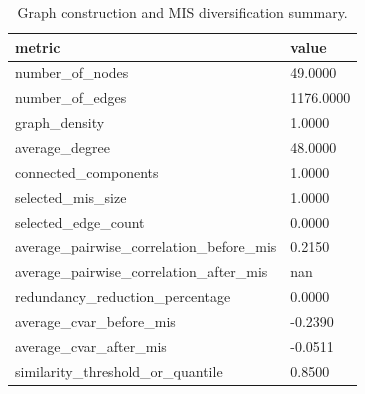 \begin{table}[htbp]
\centering
\begin{tabular}{ll}
\hline
metric & value \\
\hline
number_of_nodes & 49.0000 \\
number_of_edges & 1176.0000 \\
graph_density & 1.0000 \\
average_degree & 48.0000 \\
connected_components & 1.0000 \\
selected_mis_size & 1.0000 \\
selected_edge_count & 0.0000 \\
average_pairwise_correlation_before_mis & 0.2150 \\
average_pairwise_correlation_after_mis & nan \\
redundancy_reduction_percentage & 0.0000 \\
average_cvar_before_mis & -0.2390 \\
average_cvar_after_mis & -0.0511 \\
similarity_threshold_or_quantile & 0.8500 \\
\hline
\end{tabular}
\caption{Graph construction and MIS diversification summary.}
\label{table_graph_diversification}
\end{table}